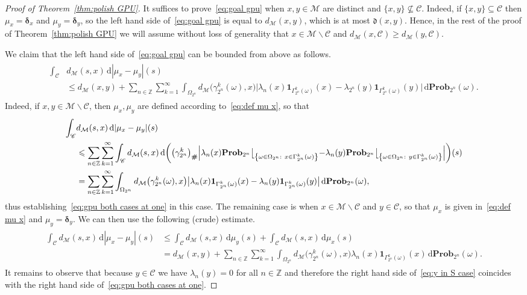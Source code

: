 \documentclass[11pt,reqno]{amsart}
\renewcommand{\le}{\leqslant}
\renewcommand{\ge}{\geqslant}
\renewcommand{\setminus}{\smallsetminus}
\newcommand{\ud}[0]{\,\mathrm{d}}
\newcommand{\bd}{\boldsymbol{\delta}}
\renewcommand{\bd}{\boldsymbol{\delta}}
\theoremstyle{remark}
\newcommand{\MM}{\mathcal{M}}
\renewcommand{\subset}{\subseteq}
\newcommand{\Z}{\mathbb Z}
\renewcommand{\Pr}{\mathbf{Prob}}
\newcommand{\sub}{\mathscr{C}}
\renewcommand{\1}{\mathbf 1}
\begin{document}
\begin{proof}[Proof of Theorem~\ref{thm:polish GPU}]
It suffices to prove~\eqref{eq:goal gpu} when $x,y\in \MM$ are distinct and  $\{x,y\}\not\subset \sub$. Indeed, if $\{x,y\}\subset \sub$ then $\mu_x=\bd_x$ and $\mu_y=\bd_y$, so the left hand side of~\eqref{eq:goal gpu} is equal to $d_{\MM}(x,y)$, which is at most $\mathfrak{d}(x,y)$. Hence, in the rest of the proof of Theorem~\ref{thm:polish GPU} we will assume without loss of generality that $x\in \MM\setminus \sub$ and $d_{\MM}(x,\sub)\ge d_{\MM}(y,\sub)$.

We claim that the left hand side of~\eqref{eq:goal gpu} can be bounded from above as follows.
\begin{align}\label{eq:gpu both cases at one}
\begin{split}
\int_\sub  &d_{\MM}(s,x)\ud|\mu_x-\mu_y|(s)\\&\le d_{\MM}(x,y)+\sum_{n\in \Z}\sum_{k=1}^\infty  \int_{\Omega_{2^n}} d_{\MM}\big(\gamma_{2^n}^k(\omega),x\big) \big|\lambda_n(x)\1_{\Gamma_{2^n}^k(\omega)}(x)-\lambda_{2^n}(y)\1_{\Gamma_{2^n}^k(\omega)}(y)\big|\ud\Pr_{2^n}(\omega).
\end{split}
\end{align}
Indeed, if $x,y\in \MM\setminus \sub$, then $\mu_x,\mu_y$ are defined according to~\eqref{eq:def mu x}, so that
\begin{align*}
 \int_\sub  &d_{\MM}(s,x)\ud|\mu_x-\mu_y|(s)\\&\le \sum_{n\in \Z}\sum_{k=1}^\infty  \int_\sub d_{\MM}(s,x)\ud  \bigg(\big(\gamma_{2^n}^k\big)_{\textbf \#} \Big|\lambda_n(x)\Pr_{2^n}\bigl\lfloor_{\left\{\omega\in \Omega_{2^n}:\ x\in \Gamma_{2^n}^k(\omega)\right\}}-\lambda_{n}(y)\Pr_{2^n}\bigl\lfloor_{\left\{\omega\in \Omega_{2^n}:\ y\in \Gamma_{2^n}^k(\omega)\right\}}\Big|\bigg)(s)\\
 &= \sum_{n\in \Z}\sum_{k=1}^\infty  \int_{\Omega_{2^n}} d_{\MM}\big(\gamma_{2^n}^k(\omega),x\big) \big|\lambda_n(x)\1_{\Gamma_{2^n}^k(\omega)}(x)-\lambda_{n}(y)\1_{\Gamma_{2^n}^k(\omega)}(y)\big|\ud\Pr_{2^n}(\omega),
\end{align*}
thus establishing~\eqref{eq:gpu both cases at one} in this case. The remaining case is when $x\in \MM\setminus \sub$ and $y\in \sub$, so that $\mu_x$ is given in~\eqref{eq:def mu x} and $\mu_y=\bd_y$. We can then use the following (crude) estimate.
\begin{align}\label{eq:y in S case}
\begin{split}
\int_\sub  d_{\MM}(s,x)\ud|\mu_x-\mu_y|(s)&\le \int_\sub  d_{\MM}(s,x)\ud\mu_y(s)+\int_\sub  d_{\MM}(s,x)\ud \mu_x(s)\\&=d_{\MM}(x,y)+\sum_{n\in \Z}\sum_{k=1}^\infty  \int_{\Omega_{2^n}} d_{\MM}\big(\gamma_{2^n}^k(\omega),x\big) \lambda_n(x)\1_{\Gamma_{2^n}^k(\omega)}(x)\ud\Pr_{2^n}(\omega).
\end{split}
\end{align}
It remains to observe that because $y\in \sub$ we have $\lambda_n(y)=0$ for all $n\in \Z$ and therefore the right hand side of~\eqref{eq:y in S case} coincides with the right hand side of~\eqref{eq:gpu both cases at one}.


\end{proof}
\end{document}
